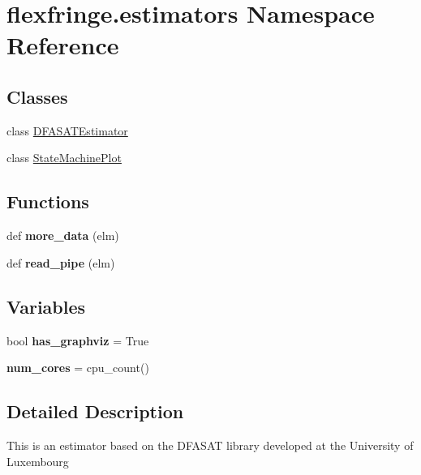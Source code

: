 \hypertarget{namespaceflexfringe_1_1estimators}{}\section{flexfringe.\+estimators Namespace Reference}
\label{namespaceflexfringe_1_1estimators}
\subsection*{Classes}
\begin{DoxyCompactItemize}
\item 
class \hyperlink{classflexfringe_1_1estimators_1_1_d_f_a_s_a_t_estimator}{D\+F\+A\+S\+A\+T\+Estimator}
\item 
class \hyperlink{classflexfringe_1_1estimators_1_1_state_machine_plot}{State\+Machine\+Plot}
\end{DoxyCompactItemize}
\subsection*{Functions}
\begin{DoxyCompactItemize}
\item 
def {\bfseries more\+\_\+data} (elm)\hypertarget{namespaceflexfringe_1_1estimators_a01339f604a337afead58cd2a664e7672}{}\label{namespaceflexfringe_1_1estimators_a01339f604a337afead58cd2a664e7672}

\item 
def {\bfseries read\+\_\+pipe} (elm)\hypertarget{namespaceflexfringe_1_1estimators_a6d19692356b138bc6e9bb421437b77d3}{}\label{namespaceflexfringe_1_1estimators_a6d19692356b138bc6e9bb421437b77d3}

\end{DoxyCompactItemize}
\subsection*{Variables}
\begin{DoxyCompactItemize}
\item 
bool {\bfseries has\+\_\+graphviz} = True\hypertarget{namespaceflexfringe_1_1estimators_ab6cb47f0087a8d0d5cb5851e4d7ed9f1}{}\label{namespaceflexfringe_1_1estimators_ab6cb47f0087a8d0d5cb5851e4d7ed9f1}

\item 
{\bfseries num\+\_\+cores} = cpu\+\_\+count()\hypertarget{namespaceflexfringe_1_1estimators_a91b386c13250711db6f6ce9fbe7757fe}{}\label{namespaceflexfringe_1_1estimators_a91b386c13250711db6f6ce9fbe7757fe}

\end{DoxyCompactItemize}


\subsection{Detailed Description}
\begin{DoxyVerb}This is an estimator based on the DFASAT library developed at the University of Luxembourg
\end{DoxyVerb}
 